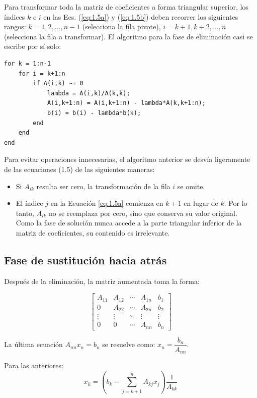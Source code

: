 \documentclass[12pt,letterpaper]{article}
\theoremstyle{definition}
\theoremstyle{plain}
\theoremstyle{remark}
\begin{document}
Para transformar toda la matriz de coeficientes a forma triangular superior, los índices $k$ e $i$ en las Ecs. (\ref{eq:1.5a}) y (\ref{eq:1.5b}) deben recorrer los siguientes rangos: $k = 1, 2, \ldots, n - 1$ (selecciona la fila pivote), $i = k+1, k+2, \ldots, n$ (selecciona la fila a transformar). El algoritmo para la fase de eliminación casi se escribe por sí solo:

\begin{verbatim}
for k = 1:n-1
    for i = k+1:n
        if A(i,k) ~= 0
            lambda = A(i,k)/A(k,k);
            A(i,k+1:n) = A(i,k+1:n) - lambda*A(k,k+1:n);
            b(i) = b(i) - lambda*b(k);
        end
    end
end
\end{verbatim}

Para evitar operaciones innecesarias, el algoritmo anterior se desvía ligeramente de las ecuaciones (1.5) de las siguientes maneras:

\begin{itemize}
  \item Si $A_{ik}$ resulta ser cero, la transformación de la fila $i$ se omite.
  \item El índice $j$ en la Ecuación \eqref{eq:1.5a} comienza en $k + 1$ en lugar de $k$. Por lo tanto, $A_{ik}$ no se reemplaza por cero, sino que conserva su valor original. Como la fase de solución nunca accede a la parte triangular inferior de la matriz de coeficientes, su contenido es irrelevante.
\end{itemize}

\subsection*{Fase de sustitución hacia atrás}

Después de la eliminación, la matriz aumentada toma la forma:

\[
\left[
\begin{array}{cccc|c}
A_{11} & A_{12} & \cdots & A_{1n} & b_1 \\
0 & A_{22} & \cdots & A_{2n} & b_2 \\
\vdots & \vdots & \ddots & \vdots & \vdots \\
0 & 0 & \cdots & A_{nn} & b_n
\end{array}
\right]
\]

La última ecuación $A_{nn}x_n = b_n$ se resuelve como: \( x_n = \dfrac{b_n}{A_{nn}}\).

Para las anteriores:
\[
x_k = \left( b_k - \sum_{j=k+1}^{n} A_{kj}x_j \right) \frac{1}{A_{kk}}
\]
\end{document}
